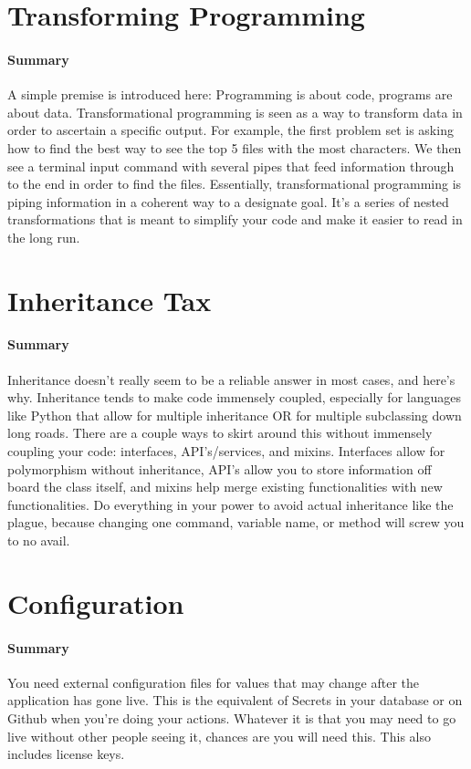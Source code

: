 \documentclass{article}
\begin{document}
\section{Transforming Programming}
    \paragraph{Summary} A simple premise is introduced here: Programming is about code, programs are about data. Transformational programming is seen as a way to transform data in order to ascertain a specific output. For example, the first problem set is asking how to find the best way to see the top 5 files with the most characters. We then see a terminal input command with several pipes that feed information through to the end in order to find the files. Essentially, transformational programming is piping information in a coherent way to a designate goal. It's a series of nested transformations that is meant to simplify your code and make it easier to read in the long run.

\section{Inheritance Tax}
    \paragraph{Summary} Inheritance doesn't really seem to be a reliable answer in most cases, and here's why. Inheritance tends to make code immensely coupled, especially for languages like Python that allow for multiple inheritance OR for multiple subclassing down long roads. There are a couple ways to skirt around this without immensely coupling your code: interfaces, API's/services, and mixins. Interfaces allow for polymorphism without inheritance, API's allow you to store information off board the class itself, and mixins help merge existing functionalities with new functionalities. Do everything in your power to avoid actual inheritance like the plague, because changing one command, variable name, or method will screw you to no avail.

\section{Configuration}
    \paragraph{Summary} You need external configuration files for values that may change after the application has gone live. This is the equivalent of Secrets in your database or on Github when you're doing your actions. Whatever it is that you may need to go live without other people seeing it, chances are you will need this. This also includes license keys.
\end{document}
